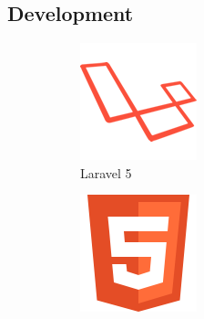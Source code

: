 \subsection{Development}
\begin{figure}[H]
	\centering
	\begin{subfigure}[t]{0.2\linewidth}
		\centering
		\includegraphics[width=\linewidth]{Images/Generic/Icons/Laravel}
		\caption{Laravel 5}\label{fig:Laravel}		
	\end{subfigure}
	\quad
	\begin{subfigure}[t]{0.2\linewidth}
		\centering
		\includegraphics[width=\linewidth]{Images/Generic/Icons/HTML_5}

\end{subfigure}
\end{figure}
